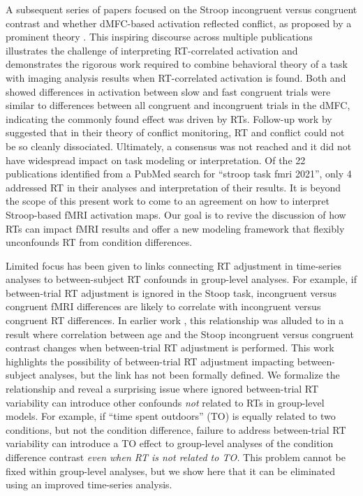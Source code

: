 \documentclass[sn-mathphys,Numbered, super, referee, lineno]{sn-jnl}
\begin{document}
A subsequent series of papers focused on the Stroop incongruent versus congruent contrast and whether dMFC-based activation reflected conflict, as proposed by a prominent theory \cite{botvinick2001}.  This inspiring discourse across multiple publications illustrates the challenge of interpreting RT-correlated activation and demonstrates the rigorous work required to combine behavioral theory of a task with imaging analysis results when RT-correlated activation is found.  Both \citet{grinband_dorsal_2011} and \citet{carp_conditional_2010} showed differences in activation between slow and fast congruent trials were similar to differences between all congruent and incongruent trials in the dMFC, indicating the commonly found effect was driven by RTs.  Follow-up work by \citet{yeung_errors_2011}  suggested that in their theory of conflict monitoring, RT and conflict could not be so cleanly dissociated.   Ultimately, a consensus was not reached \citep{brown_medial_2011, grinbandConflictErrorLikelihood2011, nachevBlindExecutive2011} and it did not have widespread impact on task modeling or interpretation. 
Of the 22 publications identified from a PubMed search for ``stroop task fmri 2021'', only 4 addressed RT in their analyses and interpretation of their results. It is beyond the scope of this present work to come to an agreement on how to interpret Stroop-based fMRI activation maps.  Our goal is to revive the discussion of how RTs can impact fMRI results and offer a new modeling framework that flexibly unconfounds RT from condition differences.



Limited focus has been given to links connecting RT adjustment in time-series analyses to between-subject RT confounds in group-level analyses. For example, if between-trial RT adjustment is ignored in the Stoop task, incongruent versus congruent fMRI differences are likely to correlate with incongruent versus congruent RT differences. In earlier work \citep{carpRemovingEffectResponse2012}, this relationship was alluded to in a result where correlation between age and the Stoop incongruent versus congruent contrast changes when between-trial RT adjustment is performed. This work highlights the possibility of between-trial RT adjustment impacting between-subject analyses, but the link has not been formally defined. We formalize the relationship and reveal a surprising issue where ignored between-trial RT variability can introduce other confounds \emph{not} related to RTs in group-level models.  For example, if ``time spent outdoors'' (TO) is equally related to two conditions, but not the condition difference, failure to address between-trial RT variability can introduce a TO effect to group-level analyses of the condition difference contrast \emph{even when RT is not related to TO.}  This problem cannot be fixed within  group-level analyses, but we show here that it can be eliminated using an improved time-series analysis.
\end{document}
